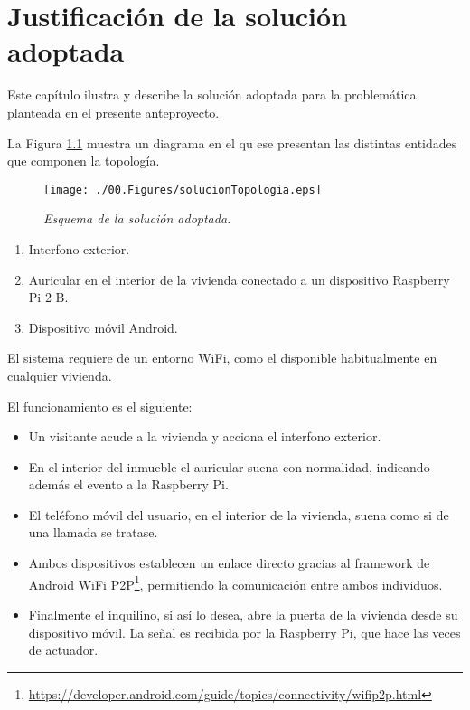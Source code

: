 \chapter{Justificación de la solución adoptada}
\label{chap:justificacion}
\onehalfspacing

Este capítulo ilustra y describe la solución adoptada para la problemática planteada en el presente anteproyecto.

La Figura \ref{fig:solucionTopologia} muestra un diagrama en el qu ese presentan las distintas entidades que componen la topología. 
\begin{figure}[h]
	\centering
	\texttt{[image: ./00.Figures/solucionTopologia.eps]}
	\caption{\textit{Esquema de la solución adoptada.}}
	\label{fig:solucionTopologia}
\end{figure}

\begin{enumerate}
	\item Interfono exterior.
	\item Auricular en el interior de la vivienda conectado a un dispositivo Raspberry Pi 2 B. 
	\item Dispositivo móvil Android.
\end{enumerate}

El sistema requiere de un entorno WiFi, como el disponible habitualmente en cualquier vivienda. 

El funcionamiento es el siguiente:
\begin{itemize}
	\item Un visitante acude a la vivienda y acciona el interfono exterior.
	\item En el interior del inmueble el auricular suena con normalidad, indicando además el evento a la Raspberry Pi.
	\item El teléfono móvil del usuario, en el interior de la vivienda, suena como si de una llamada se tratase.
	\item Ambos dispositivos establecen un enlace directo gracias al framework de Android WiFi P2P\footnote{\url{https://developer.android.com/guide/topics/connectivity/wifip2p.html}}, permitiendo la comunicación entre ambos individuos.
	\item Finalmente el inquilino, si así lo desea, abre la puerta de la vivienda desde su dispositivo móvil. La señal es recibida por la Raspberry Pi, que hace las veces de actuador. 
\end{itemize}

